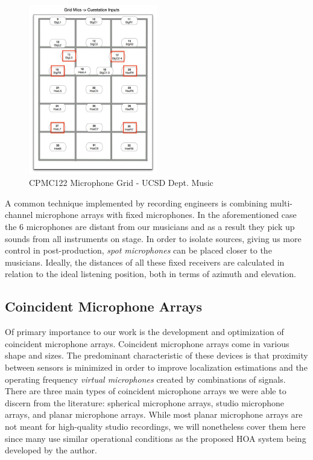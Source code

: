 \begin{figure}[h!]%
\centering
\includegraphics[width=0.5\textwidth]{img/cpmc122-mics.jpg} 
\caption{CPMC122 Microphone Grid - UCSD Dept. Music}
\label{fig:cpmc122-mic-grid}

\end{figure}

A common technique implemented by recording engineers is combining multi-channel microphone arrays with fixed microphones. In the aforementioned case the 6 microphones are distant from our musicians and as a result they pick up sounds from all instruments on stage. In order to isolate sources, giving us more control in post-production, \textit{spot microphones} can be placed closer to the musicians. Ideally, the distances of all these fixed receivers are calculated in relation to the ideal listening position, both in terms of azimuth and elevation. 

\subsection{Coincident Microphone Arrays}

Of primary importance to our work is the development and optimization of coincident microphone arrays. Coincident microphone arrays come in various shape and sizes. The predominant characteristic of these devices is that proximity between sensors is minimized in order to improve localization estimations and the operating frequency \textit{virtual microphones} created by combinations of signals. There are three main types of coincident microphone arrays we were able to discern from the literature: spherical microphone arrays, studio microphone arrays, and planar microphone arrays. While most planar microphone arrays are not meant for high-quality studio recordings, we will nonetheless cover them here since many use similar operational conditions as the proposed HOA system being developed by the author. 
